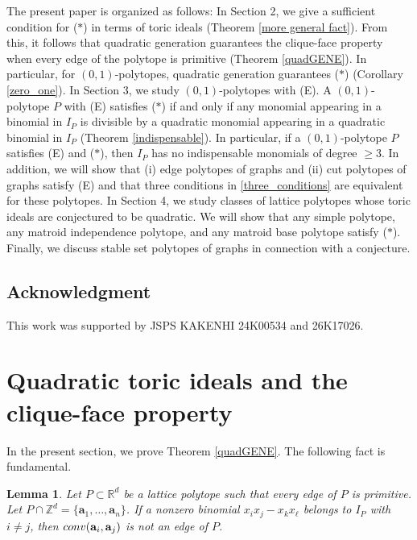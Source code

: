 \documentclass[10pt,a4paper]{amsart}
\newtheorem{lemma}[thm]{Lemma}
\numberwithin{thm}{section}
\numberwithin{equation}{section}
\def\NZQ{\mathbb}               %
\def\ZZ{{\NZQ Z}}
\def\RR{{\NZQ R}}
\def\ab{{\mathbf a}}
\begin{document}
The present paper is organized as follows:
In Section 2, we give a sufficient condition for ($*$) in terms of toric ideals (Theorem \ref{more general fact}).
From this, it follows that quadratic generation guarantees the clique-face property when every edge of the polytope is primitive (Theorem \ref{quadGENE}).
In particular, for $(0,1)$-polytopes, quadratic generation guarantees ($*$) (Corollary \ref{zero_one}).
In Section 3, we study $(0,1)$-polytopes with (E).
        A $(0,1)$-polytope $P$ with (E) satisfies ($*$) if and only if any monomial appearing in a binomial in $I_P$ is divisible by a quadratic monomial appearing in a quadratic binomial in $I_P$ (Theorem \ref{indispensable}).
In particular,     
    if a $(0,1)$-polytope $P$ satisfies (E) and ($*$), then $I_P$ has no indispensable monomials of degree $\ge 3$.  
In addition, we will show that (i) edge polytopes of graphs and (ii) cut polytopes of graphs satisfy (E) and that
three conditions in \eqref{three_conditions} are equivalent for these polytopes.
In Section 4, we study classes of lattice polytopes whose toric ideals are conjectured to be quadratic.
We will show that any simple polytope, any matroid independence polytope, and any matroid base polytope satisfy ($*$).
Finally, we discuss stable set polytopes of graphs in connection with a conjecture.


\subsection*{Acknowledgment}
This work was supported by 
JSPS KAKENHI 24K00534 and 26K17026.

\section{Quadratic toric ideals and the clique-face property}

In the present section, we prove Theorem \ref{quadGENE}.
The following fact is fundamental.

\begin{lemma}\label{key}
Let $P \subset \RR^d$ be a lattice polytope
such that every edge of $P$ is primitive.
Let $P \cap \ZZ^d = \{\ab_1,\ldots,\ab_n\}$.
If a nonzero binomial $x_i x_j - x_k x_\ell$ 
belongs to $I_P$ with $i\neq j$, then ${\rm conv}(\ab_i , \ab_j)$ is not an edge of $P$.
\end{lemma}
\end{document}
